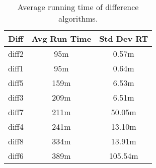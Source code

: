 \begin{table}[tbph]
\begin{center}
\begin{tabular}{|c||c|c|}
\hline
Diff & Avg Run Time & Std Dev RT  \\
\hline
\hline
diff2 & 95m & 0.57m \\
diff1 & 95m & 0.64m \\
diff5 & 159m & 6.53m \\
diff3 & 209m & 6.51m \\
diff7 & 211m & 50.05m \\
diff4 & 241m & 13.10m \\
diff8 & 334m & 13.91m \\
diff6 & 389m & 105.54m \\
\hline
\end{tabular}
\end{center}
\caption{Average running time of difference algorithms.}
\label{tab:difftiming}
\end{table}
